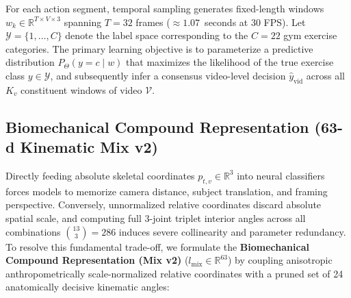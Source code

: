 \documentclass[runningheads]{llncs}
\begin{document}
For each action segment, temporal sampling generates fixed-length windows $w_k \in \mathbb{R}^{T \times V \times 3}$ spanning $T = 32$ frames ($\approx 1.07$~seconds at 30 FPS). Let $\mathcal{Y} = \{1, \dots, C\}$ denote the label space corresponding to the $C = 22$ gym exercise categories. The primary learning objective is to parameterize a predictive distribution $P_\Theta(y = c \mid w)$ that maximizes the likelihood of the true exercise class $y \in \mathcal{Y}$, and subsequently infer a consensus video-level decision $\hat{y}_{\text{vid}}$ across all $K_v$ constituent windows of video $\mathcal{V}$.

\subsection{Biomechanical Compound Representation (63-d Kinematic Mix v2)}
Directly feeding absolute skeletal coordinates $p_{t, v} \in \mathbb{R}^3$ into neural classifiers forces models to memorize camera distance, subject translation, and framing perspective. Conversely, unnormalized relative coordinates discard absolute spatial scale, and computing full 3-joint triplet interior angles across all combinations $\binom{13}{3} = 286$ induces severe collinearity and parameter redundancy. To resolve this fundamental trade-off, we formulate the \textbf{Biomechanical Compound Representation (Mix v2)} ($l_{\text{mix}} \in \mathbb{R}^{63}$) by coupling anisotropic anthropometrically scale-normalized relative coordinates with a pruned set of 24 anatomically decisive kinematic angles:
\end{document}
